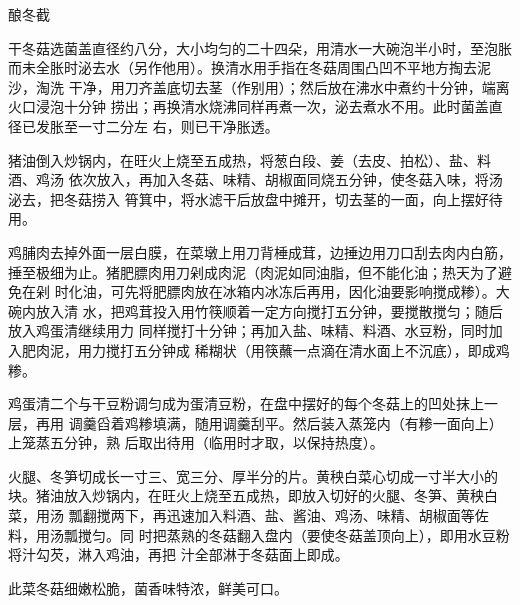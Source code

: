 \begin{recipe}{酿冬截}

\ingredients


\preparation

\step 干冬菇选菌盖直径约八分，大小均匀的二十四朵，用清水一大碗泡半小时，至泡胀
而未全胀时泌去水（另作他用）。换清水用手指在冬菇周围凸凹不平地方掏去泥沙，淘洗
干净，用刀齐盖底切去茎（作别用）；然后放在沸水中煮约十分钟，端离火口浸泡十分钟
捞出；再换清水烧沸同样再煮一次，泌去煮水不用。此时菌盖直径已发胀至一寸二分左
右，则已干净胀透。

猪油倒入炒锅内，在旺火上烧至五成热，将葱白段、姜（去皮、拍松）、盐、料酒、鸡汤
依次放入，再加入冬菇、味精、胡椒面同烧五分钟，使冬菇入味，将汤泌去，把冬菇捞入
筲箕中，将水滤干后放盘中摊开，切去茎的一面，向上摆好待用。

\step 鸡脯肉去掉外面一层白膜，在菜墩上用刀背棰成茸，边捶边用刀口刮去肉内白筋，
捶至极细为止。猪肥膘肉用刀剁成肉泥（肉泥如同油脂，但不能化油；热天为了避免在剁
时化油，可先将肥膘肉放在冰箱内冰冻后再用，因化油要影响搅成糁）。大碗内放入清
水，把鸡茸投入用竹筷顺着一定方向搅打五分钟，要搅散搅匀；随后放入鸡蛋清继续用力
同样搅打十分钟；再加入盐、味精、料酒、水豆粉，同时加入肥肉泥，用力搅打五分钟成
稀糊状（用筷蘸一点滴在清水面上不沉底），即成鸡糁。

鸡蛋清二个与干豆粉调匀成为蛋清豆粉，在盘中摆好的每个冬菇上的凹处抹上一层，再用
调羹舀着鸡糁填满，随用调羹刮平。然后装入蒸笼内（有糁一面向上）上笼蒸五分钟，熟
后取出待用（临用时才取，以保持热度）。

\step 火腿、冬笋切成长一寸三、宽三分、厚半分的片。黄秧白菜心切成一寸半大小的
块。猪油放入炒锅内，在旺火上烧至五成热，即放入切好的火腿、冬笋、黄秧白菜，用汤
瓢翻搅两下，再迅速加入料酒、盐、酱油、鸡汤、味精、胡椒面等佐料，用汤瓢搅匀。同
时把蒸熟的冬菇翻入盘内（要使冬菇盖顶向上），即用水豆粉将汁勾芡，淋入鸡油，再把
汁全部淋于冬菇面上即成。

\features

此菜冬菇细嫩松脆，菌香味特浓，鲜美可口。

\end{recipe}


